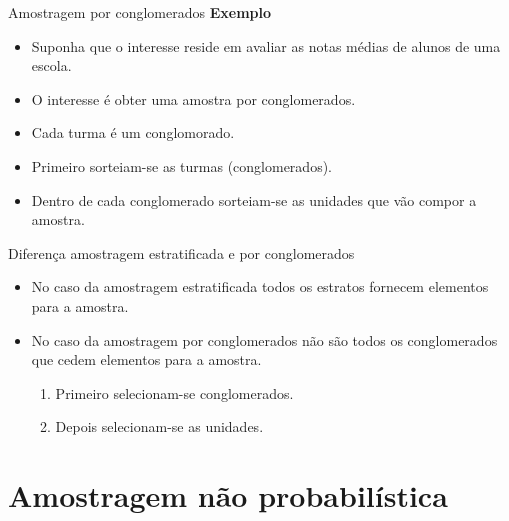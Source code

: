 \documentclass[
  ignorenonframetext,
  serif,
  professionalfont,
  usenames,
  dvipsnames,
  aspectratio = 169]{beamer}
\providecommand{\tightlist}{%
  \setlength{\itemsep}{0pt}\setlength{\parskip}{0pt}}
\renewcommand{\tightlist}{%
  \setlength{\itemsep}{0\baselineskip}
  \setlength{\parskip}{0.25\baselineskip}
}
\begin{document}
\begin{frame}{Amostragem por conglomerados}
\protect\hypertarget{amostragem-por-conglomerados-1}{}
\textbf{Exemplo}

\begin{itemize}
\item
  Suponha que o interesse reside em avaliar as notas médias de alunos de
  uma escola.
\item
  O interesse é obter uma amostra por conglomerados.
\item
  Cada turma é um conglomorado.
\item
  Primeiro sorteiam-se as turmas (conglomerados).
\item
  Dentro de cada conglomerado sorteiam-se as unidades que vão compor a
  amostra.
\end{itemize}
\end{frame}

\begin{frame}{Diferença amostragem estratificada e por conglomerados}
\protect\hypertarget{diferenuxe7a-amostragem-estratificada-e-por-conglomerados}{}
\begin{itemize}
\item
  No caso da amostragem estratificada todos os estratos fornecem
  elementos para a amostra.
\item
  No caso da amostragem por conglomerados não são todos os conglomerados
  que cedem elementos para a amostra.

  \begin{enumerate}
  \tightlist
  \item
    Primeiro selecionam-se conglomerados.
  \item
    Depois selecionam-se as unidades.
  \end{enumerate}
\end{itemize}
\end{frame}

\hypertarget{amostragem-nuxe3o-probabiluxedstica}{%
\section{Amostragem não
probabilística}\label{amostragem-nuxe3o-probabiluxedstica}}
\end{document}

